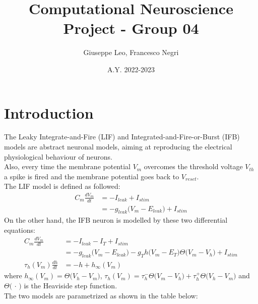 \documentclass[11pt]{article}
\title{Computational Neuroscience Project - Group 04}
\author{Giuseppe Leo, Francesco Negri}
\date{A.Y. 2022-2023}
\begin{document}
\maketitle

\section*{Introduction}
The Leaky Integrate-and-Fire (LIF) and Integrated-and-Fire-or-Burst (IFB) models
are abstract neuronal models, aiming at reproducing the electrical physiological
behaviour of neurons.\\
Also, every time the membrane potential \(V_{m}\) overcomes the threshold voltage
\(V_{th}\) a spike is fired and the membrane potential goes back to \(V_{reset}\).\\
The LIF model is defined as followed:
\begin{align*}
    C_{m}\frac{dV_{m}}{dt} & =-I_{leak}+I_{stim}                           \\
                           & =-g_{leak}\bigl(V_{m}-E_{leak}\bigr)+I_{stim}
\end{align*}
On the other hand, the IFB neuron is modelled by these two differential equations:
\begin{align*}
    C_{m}\frac{dV_{m}}{dt}       & =-I_{leak}-I_{T}+I_{stim}                                                                                \\
                                 & =-g_{leak}\bigl(V_{m}-E_{leak}\bigr)-g_{T}h\bigl(V_{m}-E_{T}\bigr)\Theta\bigl(V_{m}-V_{h}\bigr)+I_{stim} \\
    \tau_{h}(V_{m})\frac{dh}{dt} & =-h+h_{\infty}(V_{m})
\end{align*}
where \(h_{\infty}(V_{m})=\Theta\bigl(V_{h}-V_{m}\bigr)\),
\(\tau_{h}(V_{m})=\tau_{h}^{-}\Theta\bigl(V_{m}-V_{h}\bigr)+\tau_{h}^{+}\Theta\bigl(V_{h}-V_{m}\bigr)\) and
\(\Theta\bigl(\,\cdot\,\bigr)\) is the Heaviside step function.\\
The two models are parametrized as shown in the table below:
\end{document}
